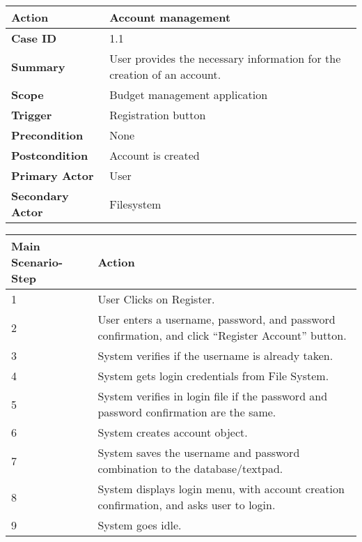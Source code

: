 \documentclass[letterpaper]{article}
\begin{document}
        \begin{center}
        	\begin{tabular}{ | m{5cm} | m{10cm}| } 
	            \hline
	            \textbf{Action} & Account management \\ 
	            \hline
	            \textbf{Case ID} & 1.1 \\ 
	            \hline
	            \textbf{Summary} & User provides the necessary information for the creation of an account. \\
	            \hline
	            \textbf{Scope} & Budget management application \\ 
	            \hline
	            \textbf{Trigger} & Registration button \\
	            \hline
	            \textbf{Precondition} & None \\ 
	            \hline
	            \textbf{Postcondition} & Account is created \\ 
	            \hline
	            \textbf{Primary Actor} & User \\ 
	            \hline
	            \textbf{Secondary Actor} & Filesystem \\ 
	            \hline
        	\end{tabular}
        
        	\vspace{2mm}
        
			\begin{tabular}{ | m{5cm} | m{10cm}| } 
				\hline
	            \textbf{Main Scenario-Step} & \textbf{Action} \\ 
	            \hline
	            1 & User Clicks on Register. \\ 
	            \hline
	            2 & User enters a username, password, and password confirmation, and click “Register Account” button. \\ 
	            \hline
	            3 & System verifies if the username is already taken. \\ 
	            \hline
	            4 & System gets login credentials from File System. \\ 
	            \hline
	            5 & System verifies in login file if the password and password confirmation are the same. \\ 
	            \hline
	            6 & System creates account object. \\ 
	            \hline
	            7 & System saves the username and password combination to the database/textpad. \\
	            \hline
	            8 & System displays login menu, with account creation confirmation, and asks user to login. \\ 
	            \hline
	            9 & System goes idle. \\ 
	            \hline
        	\end{tabular}
        \end{center}
        
\end{document}
